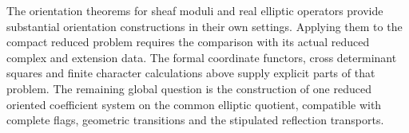 The orientation theorems for sheaf moduli and real elliptic operators
\cite{JoyceUpmeier,JoyceTanakaUpmeier} provide substantial orientation
constructions in their own settings.  Applying them to the compact
reduced problem requires the comparison with its actual reduced
complex and extension data.  The formal coordinate functors, cross
determinant squares and finite character calculations above supply
explicit parts of that problem.  The remaining global question is
the construction of one reduced oriented coefficient system on the
common elliptic quotient, compatible with complete flags, geometric
transitions and the stipulated reflection transports.
